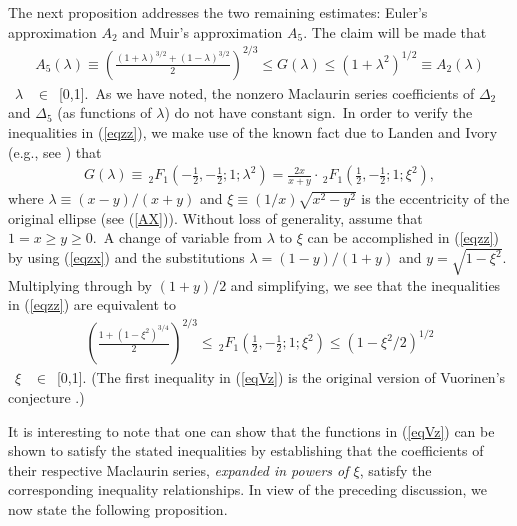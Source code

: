\documentclass[final,oneeqnum]{siamltex}
\begin{document}
The next proposition addresses the two remaining estimates: Euler's
approximation $A_{2}$ and  Muir's approximation
$A_{5}$.
 The claim will be made that
\begin{eqnarray}
 A_{5}(\lambda) \equiv \left(\frac{(1+\lambda)^{3/2} +
 (1-\lambda)^{3/2}}{2}\right)^{2/3}\leq G(\lambda)\leq
(1+\lambda^2)^{1/2}\equiv A_{2}(\lambda) 
\label{eqzz}
\end{eqnarray} 
\ $\lambda$ \, $\in$ \,[0,1].\ As we have noted, the
 nonzero Maclaurin series coefficients of
$\Delta_{2}$ and $\Delta_{5}$ (as functions of $\lambda$) do
not have   constant sign.\   In order to verify the inequalities
in (\ref{eqzz}), we make use of the known fact due to Landen and Ivory
(e.g., see \cite[p. 598]{AB}) that
\begin{eqnarray}
G(\lambda)\equiv\,_{2}F_{1}\left(-\frac{1}{2},-\frac{1}{2};1;\lambda^2\right)
 =\frac{2x}{x+y}
\cdot\,_{2}F_{1}\left(\frac{1}{2},-\frac{1}{2};1;\xi^2\right), \label{eqzx}
\end{eqnarray} 
where  $\lambda \equiv (x-y)/(x+y)$ and
 $\xi\equiv (1/x){\textstyle\sqrt{x^2-y^2}}$
is the \label{`eccentricity'}
eccentricity of the original ellipse (see (\ref{AX})).
 Without loss of generality,  assume that $1=x\geq y\geq 0$.\ A change of
variable
 from $\lambda$ to $\xi$  can be
accomplished in (\ref{eqzz}) by using 
(\ref{eqzx}) and
 the substitutions  $\lambda =(1-y)/(1+y)$ and $y=\textstyle\sqrt{1-\xi^2}$.
 Multiplying through by $(1+y)/2$
 and
 simplifying, we see that the inequalities in (\ref{eqzz}) are equivalent to
\begin{eqnarray}
\left( \frac{1+(1-\xi^2)^{3/4}}{2}\right) ^{2/3} \leq
\,_{2}F_{1}\left(\frac{1}{2},-\frac{1}{2};1;\xi^{2}\right)\leq
 (1-\xi^2/2)^{1/2} 
\label{eqVz}
\end{eqnarray}
\ $\xi$ \, $\in$ \,[0,1]. (The first inequality in (\ref{eqVz}) is the original version of Vuorinen's
conjecture \cite{MV}.)

It is interesting to note that one can show that the  functions
in (\ref{eqVz}) can
be shown to satisfy the stated inequalities  by
establishing that the  coefficients of their respective Maclaurin series,
{\em expanded in powers of $\xi$}, satisfy the
corresponding inequality relationships.
\noindent In view of the preceding discussion, we now state the following proposition.
\vfil
\end{document}

